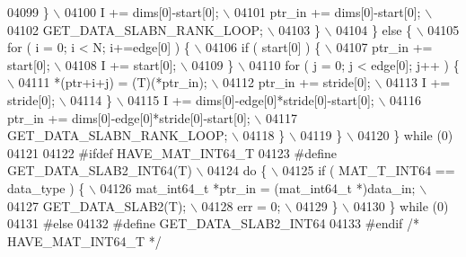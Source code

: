 \begin{DoxyCode}
{{{{{{{{{{{{{{{{{{{{{{{{{04099 \textcolor{preprocessor}{                \} \(\backslash\)}
04100 \textcolor{preprocessor}{                I += dims[0]-start[0]; \(\backslash\)}
04101 \textcolor{preprocessor}{                ptr\_in += dims[0]-start[0]; \(\backslash\)}
04102 \textcolor{preprocessor}{                GET\_DATA\_SLABN\_RANK\_LOOP; \(\backslash\)}
04103 \textcolor{preprocessor}{            \} \(\backslash\)}
04104 \textcolor{preprocessor}{        \} else \{ \(\backslash\)}
04105 \textcolor{preprocessor}{            for ( i = 0; i < N; i+=edge[0] ) \{ \(\backslash\)}
04106 \textcolor{preprocessor}{                if ( start[0] ) \{ \(\backslash\)}
04107 \textcolor{preprocessor}{                    ptr\_in += start[0]; \(\backslash\)}
04108 \textcolor{preprocessor}{                    I += start[0]; \(\backslash\)}
04109 \textcolor{preprocessor}{                \} \(\backslash\)}
04110 \textcolor{preprocessor}{                for ( j = 0; j < edge[0]; j++ ) \{ \(\backslash\)}
04111 \textcolor{preprocessor}{                    *(ptr+i+j) = (T)(*ptr\_in); \(\backslash\)}
04112 \textcolor{preprocessor}{                    ptr\_in += stride[0]; \(\backslash\)}
04113 \textcolor{preprocessor}{                    I += stride[0]; \(\backslash\)}
04114 \textcolor{preprocessor}{                \} \(\backslash\)}
04115 \textcolor{preprocessor}{                I += dims[0]-edge[0]*stride[0]-start[0]; \(\backslash\)}
04116 \textcolor{preprocessor}{                ptr\_in += dims[0]-edge[0]*stride[0]-start[0]; \(\backslash\)}
04117 \textcolor{preprocessor}{                GET\_DATA\_SLABN\_RANK\_LOOP; \(\backslash\)}
04118 \textcolor{preprocessor}{            \} \(\backslash\)}
04119 \textcolor{preprocessor}{        \} \(\backslash\)}
04120 \textcolor{preprocessor}{    \} while (0)}
04121 
04122 \textcolor{preprocessor}{#ifdef HAVE\_MAT\_INT64\_T}
04123 \textcolor{preprocessor}{#define GET\_DATA\_SLAB2\_INT64(T) \(\backslash\)}
04124 \textcolor{preprocessor}{    do \{ \(\backslash\)}
04125 \textcolor{preprocessor}{        if ( MAT\_T\_INT64 == data\_type ) \{ \(\backslash\)}
04126 \textcolor{preprocessor}{            mat\_int64\_t *ptr\_in = (mat\_int64\_t *)data\_in; \(\backslash\)}
04127 \textcolor{preprocessor}{            GET\_DATA\_SLAB2(T); \(\backslash\)}
04128 \textcolor{preprocessor}{            err = 0; \(\backslash\)}
04129 \textcolor{preprocessor}{        \} \(\backslash\)}
04130 \textcolor{preprocessor}{    \} while (0)}
04131 \textcolor{preprocessor}{#else}
04132 \textcolor{preprocessor}{#define GET\_DATA\_SLAB2\_INT64}
04133 \textcolor{preprocessor}{#endif }\textcolor{comment}{/* HAVE\_MAT\_INT64\_T */}\textcolor{preprocessor}{}
}}}}}}}}}}}}}}}}}}}}}}}}}
\end{DoxyCode}
